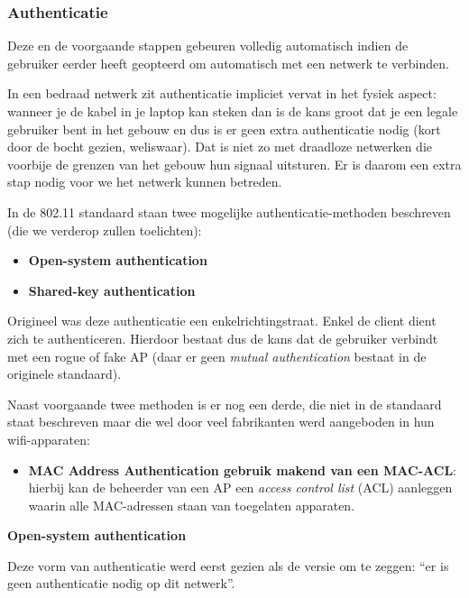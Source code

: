 \documentclass[
  10pt,
  dutch,
  paper=a4,
  ,captions=tableheading
]{scrbook}
\providecommand{\tightlist}{%
  \setlength{\itemsep}{0pt}\setlength{\parskip}{0pt}}
\begin{document}
\subsubsection{Authenticatie}\label{authenticatie}

\begin{noteblock}
Deze en de voorgaande stappen gebeuren volledig automatisch indien de
gebruiker eerder heeft geopteerd om automatisch met een netwerk te
verbinden.
\end{noteblock}

In een bedraad netwerk zit authenticatie impliciet vervat in het fysiek
aspect: wanneer je de kabel in je laptop kan steken dan is de kans groot
dat je een legale gebruiker bent in het gebouw en dus is er geen extra
authenticatie nodig (kort door de bocht gezien, weliswaar). Dat is niet
zo met draadloze netwerken die voorbije de grenzen van het gebouw hun
signaal uitsturen. Er is daarom een extra stap nodig voor we het netwerk
kunnen betreden.

In de 802.11 standaard staan twee mogelijke authenticatie-methoden
beschreven (die we verderop zullen toelichten):

\begin{itemize}
\tightlist
\item
  \textbf{Open-system authentication}
\item
  \textbf{Shared-key authentication}
\end{itemize}

Origineel was deze authenticatie een enkelrichtingstraat. Enkel de
client dient zich te authenticeren. Hierdoor bestaat dus de kans dat de
gebruiker verbindt met een rogue of fake AP (daar er geen \emph{mutual
authentication} bestaat in de originele standaard).

Naast voorgaande twee methoden is er nog een derde, die niet in de
standaard staat beschreven maar die wel door veel fabrikanten werd
aangeboden in hun wifi-apparaten:

\begin{itemize}
\tightlist
\item
  \textbf{MAC Address Authentication gebruik makend van een MAC-ACL}:
  hierbij kan de beheerder van een AP een \emph{access control list}
  (ACL) aanleggen waarin alle MAC-adressen staan van toegelaten
  apparaten.
\end{itemize}

\textbf{Open-system authentication}

Deze vorm van authenticatie werd eerst gezien als de versie om te
zeggen: ``er is geen authenticatie nodig op dit netwerk''.
\end{document}

